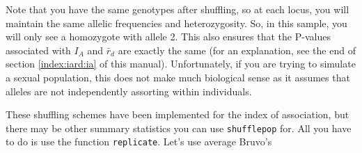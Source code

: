 \documentclass[letterpaper]{article}\usepackage[]{graphicx}\usepackage[]{color}
\begin{document}
\begin{itemize}
\begin{enumerate}
\begin{table}[h!]
\centering
{}
\end{table}

Note that you have the same genotypes after shuffling, so at each locus, you will maintain the same allelic frequencies and heterozygosity. So, in this sample, you will only see a homozygote with allele 2. This also ensures that the P-values associated with $I_A$ and $\bar r_d$ are exactly the same (for an explanation, see the end of section \ref{index:iard:ia} of this manual). Unfortunately, if you are trying to simulate a sexual population, this does not make much biological sense as it assumes that alleles are not independently assorting within individuals.
  \end{enumerate}
\end{itemize}
These shuffling schemes have been implemented for the index of association, but there may be other summary statistics you can use \texttt{shufflepop} for. All you have to do is use the function \texttt{replicate}. Let's use average Bruvo's
\end{document}
